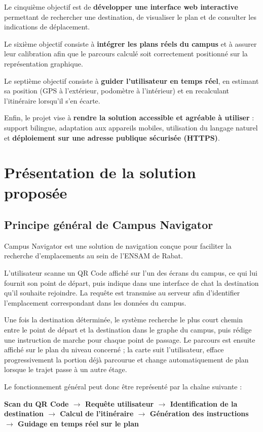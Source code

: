 \documentclass[12pt,a4paper]{report}
\begin{document}
Le cinquième objectif est de \textbf{développer une interface web interactive} permettant de
rechercher une destination, de visualiser le plan et de consulter les indications de
déplacement.

Le sixième objectif consiste à \textbf{intégrer les plans réels du campus} et à assurer leur
calibration afin que le parcours calculé soit correctement positionné sur la représentation
graphique.

Le septième objectif consiste à \textbf{guider l'utilisateur en temps réel}, en estimant sa
position (GPS à l'extérieur, podomètre à l'intérieur) et en recalculant l'itinéraire lorsqu'il
s'en écarte.

Enfin, le projet vise à \textbf{rendre la solution accessible et agréable à utiliser} : support
bilingue, adaptation aux appareils mobiles, utilisation du langage naturel et
\textbf{déploiement sur une adresse publique sécurisée (HTTPS)}.

\section{Présentation de la solution proposée}

\subsection{Principe général de Campus Navigator}

Campus Navigator est une solution de navigation conçue pour faciliter la recherche
d'emplacements au sein de l'ENSAM de Rabat.

L'utilisateur scanne un QR Code affiché sur l'un des écrans du campus, ce qui lui fournit son
point de départ, puis indique dans une interface de chat la destination qu'il souhaite
rejoindre. La requête est transmise au serveur afin d'identifier l'emplacement correspondant dans
les données du campus.

Une fois la destination déterminée, le système recherche le plus court chemin entre le point de
départ et la destination dans le graphe du campus, puis rédige une instruction de marche pour
chaque point de passage. Le parcours est ensuite affiché sur le plan du niveau concerné ; la
carte suit l'utilisateur, efface progressivement la portion déjà parcourue et change
automatiquement de plan lorsque le trajet passe à un autre étage.

Le fonctionnement général peut donc être représenté par la chaîne suivante :

\begin{center}
\textbf{Scan du QR Code $\rightarrow$ Requête utilisateur $\rightarrow$ Identification de la
destination $\rightarrow$ Calcul de l'itinéraire $\rightarrow$ Génération des instructions
$\rightarrow$ Guidage en temps réel sur le plan}
\end{center}
\end{document}
